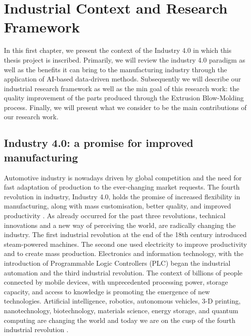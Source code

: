 \chapter{Industrial Context and Research Framework}
\minitoc

In this first chapter, we present the context of the Industry 4.0 in which this thesis project is inscribed. Primarily, we will review the industry 4.0 paradigm as well as the benefits it can bring to the manufacturing industry through the application of AI-based data-driven methods. Subsequently we will describe our industrial research framework as well as the min goal of this research work: the quality improvement of the parts produced through the Extrusion Blow-Molding process. Finally, we will present what we consider to be the main contributions of our research work.

\section{Industry 4.0: a promise for improved manufacturing}

Automotive industry is nowadays driven by global competition and the need for fast adaptation of production to the ever-changing market requests. The fourth revolution in industry, Industry 4.0, holds the promise of increased flexibility in manufacturing, along with mass customisation, better quality, and improved productivity \citep{zhong2017intelligent}. As already occurred for the past three revolutions, technical innovations and a new way of perceiving the world, are radically changing the industry. The first industrial revolution at the end of the 18th century introduced steam-powered machines. The second one used electricity to improve productivity and to create mass production. Electronics and information technology, with the introduction of Programmable Logic Controllers (PLC) began the industrial automation and the third industrial revolution. The context of billions of people connected by mobile devices, with unprecedented processing power, storage capacity, and access to knowledge is promoting the emergence of new technologies. Artificial intelligence, robotics, autonomous vehicles, 3-D printing, nanotechnology, biotechnology, materials science, energy storage, and quantum computing are changing the world and today we are on the cusp of the fourth industrial revolution \citep{schwab20164th}.  

